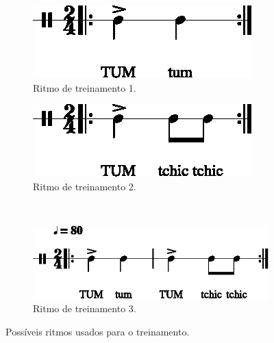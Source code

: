 \begin{figure}[ht]
\centering
\begin{subfigure}{.475\textwidth}
  \centering
  \includegraphics[width=.9\linewidth]{chapters/cap-musicalidade/timing0-1.eps}  
  \caption{Ritmo de treinamento 1.}
  \label{fig:ex:timing:a}
\end{subfigure}
\hfill	
\begin{subfigure}{.475\textwidth}
  \centering
  \includegraphics[width=.9\linewidth]{chapters/cap-musicalidade/timing1-1.eps}  
  \caption{Ritmo de treinamento 2.}
  \label{fig:ex:timing:b}
\end{subfigure}

~\\
\vspace{20pt}

\begin{subfigure}{.675\textwidth}
  \centering
  \includegraphics[width=.9\linewidth]{chapters/cap-musicalidade/timing2-1.eps}  
  \caption{Ritmo de treinamento 3.}
  \label{fig:ex:timing:c}
\end{subfigure}
\caption{Possíveis ritmos usados para o treinamento.}
\label{fig:ex:timing}
\end{figure}

